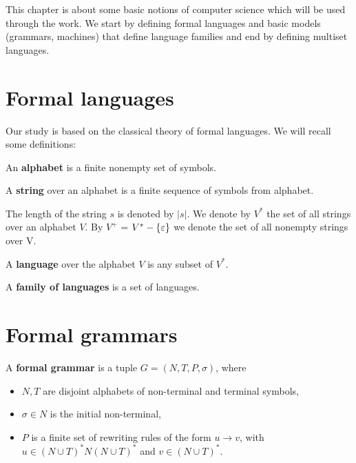 This chapter is about some basic notions of computer science which will be used through the work. We start by defining formal languages and basic models (grammars, machines) that define language families and end by defining multiset languages.

\section{Formal languages} %
\label{sec:formal_languages}

Our study is based on the classical theory of formal languages. We will recall some definitions:

\begin{definition}
An {\bf alphabet} is a finite nonempty set of symbols.
\end{definition}

\begin{definition}
A {\bf string} over an alphabet is a finite sequence of symbols from alphabet.
\end{definition}

The length of the string $s$ is denoted by $|s|$. We denote by $V^*$ the set of all strings over an alphabet $V$. By $V^+$ = $V^* - \{\varepsilon\}$ we denote the set of all nonempty strings over V.

\begin{definition}
A {\bf language} over the alphabet $V$ is any subset of $V^*$.
\end{definition}

\begin{definition}
A {\bf family of languages} is a set of languages.
\end{definition}


\section{Formal grammars} %
\label{sec:formal_grammars}

\begin{definition}
A {\bf formal grammar} is a tuple $G = (N,T,P,\sigma)$, where
\begin{itemize}
  \item $N, T$ are disjoint alphabets of non-terminal and terminal symbols,
  \item $\sigma\in N$ is the initial non-terminal,
  \item $P$ is a finite set of rewriting rules of the form $u\rightarrow v$, with $u\in (N\cup T)^*N(N\cup T)^*$ and $v\in (N\cup T)^*$.
\end{itemize}
\end{definition}

